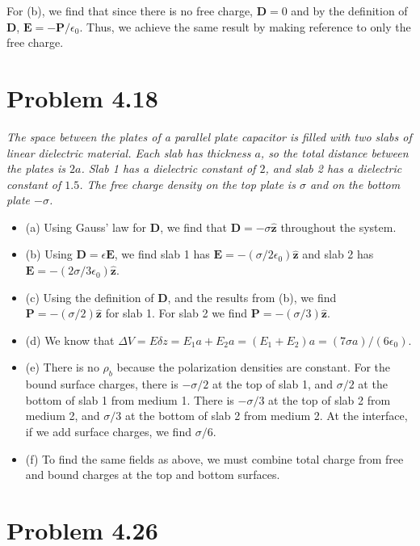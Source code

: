 \documentclass[10pt]{article}
\begin{document}
For (b), we find that since there is no free charge, $\mathbf{D} = 0$ and by the definition of $\mathbf{D}$, $\mathbf{E} = -\mathbf{P}/\epsilon_0$.  Thus, we achieve the same result by making reference to only the free charge.

\section{Problem 4.18}

\textit{The space between the plates of a parallel plate capacitor is filled with two slabs of linear dielectric material.  Each slab has thickness $a$, so the total distance between the plates is $2a$.  Slab 1 has a dielectric constant of $2$, and slab 2 has a dielectric constant of $1.5$.  The free charge density on the top plate is $\sigma$ and on the bottom plate $-\sigma$.}

\begin{itemize}
\item (a) Using Gauss' law for $\mathbf{D}$, we find that $\mathbf{D} = -\sigma \hat{\mathbf{z}}$ throughout the system.
\item (b) Using $\mathbf{D} = \epsilon \mathbf{E}$, we find slab 1 has $\mathbf{E} = - (\sigma/2\epsilon_0)\hat{\mathbf{z}}$ and slab 2 has $\mathbf{E} = -(2\sigma/3\epsilon_0) \hat{\mathbf{z}}$.
\item (c) Using the definition of $\mathbf{D}$, and the results from (b), we find $\mathbf{P} = - (\sigma/2)\hat{\mathbf{z}}$ for slab 1.  For slab 2 we find $\mathbf{P} = -(\sigma/3) \hat{\mathbf{z}}$.
\item (d) We know that $\Delta V = E \delta z = E_1 a + E_2 a = (E_1 + E_2)a = (7\sigma a)/(6\epsilon_0)$.
\item (e) There is no $\rho_b$ because the polarization densities are constant.  For the bound surface charges, there is $-\sigma/2$ at the top of slab 1, and $\sigma/2$ at the bottom of slab 1 from medium 1.  There is $-\sigma/3$ at the top of slab 2 from medium 2, and $\sigma/3$ at the bottom of slab 2 from medium 2.  At the interface, if we add surface charges, we find $\sigma/6$.
\item (f) To find the same fields as above, we must combine total charge from free and bound charges at the top and bottom surfaces.
\end{itemize}

\section{Problem 4.26}
\end{document}
